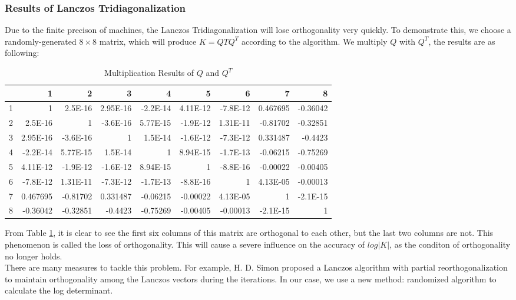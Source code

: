 \documentclass{article}
\begin{document}
\subsubsection{Results of Lanczos Tridiagonalization}
Due to the finite precison of machines, the Lanczos Tridiagonalization will lose orthogonality very quickly. To demonstrate this, we choose a randomly-generated $8\times 8$ matrix, which will produce $K=QTQ^T$ according to the algorithm. We multiply $Q$ with $Q^T$, the results are as following: 
\begin{table}[htbp]
	\centering
	\caption{Multiplication Results of $Q$ and $Q^T$}
	\begin{tabular}{rrrrrrrrr}
		\toprule
	    & 1     & 2     & 3     & 4     & 5     & 6     & 7     & 8 \\
		\midrule
		1     & 1     & 2.5E-16 & 2.95E-16 & -2.2E-14 & 4.11E-12 & -7.8E-12 & 0.467695 & -0.36042 \\
		2     & 2.5E-16 & 1     & -3.6E-16 & 5.77E-15 & -1.9E-12 & 1.31E-11 & -0.81702 & -0.32851 \\
		3     & 2.95E-16 & -3.6E-16 & 1     & 1.5E-14 & -1.6E-12 & -7.3E-12 & 0.331487 & -0.4423 \\
		4     & -2.2E-14 & 5.77E-15 & 1.5E-14 & 1     & 8.94E-15 & -1.7E-13 & -0.06215 & -0.75269 \\
		5     & 4.11E-12 & -1.9E-12 & -1.6E-12 & 8.94E-15 & 1     & -8.8E-16 & -0.00022 & -0.00405 \\
		6     & -7.8E-12 & 1.31E-11 & -7.3E-12 & -1.7E-13 & -8.8E-16 & 1     & 4.13E-05 & -0.00013 \\
		7     & 0.467695 & -0.81702 & 0.331487 & -0.06215 & -0.00022 & 4.13E-05 & 1     & -2.1E-15 \\
		8     & -0.36042 & -0.32851 & -0.4423 & -0.75269 & -0.00405 & -0.00013 & -2.1E-15 & 1 \\
		\bottomrule
	\end{tabular}%
	\label{tab1}%
\end{table}%
From Table \ref{tab1}, it is clear to see the first six columns of this matrix are orthogonal to each other, but the last two columns are not. This phenomenon is called the loss of orthogonality. This will cause a severe influence on the accuracy of $log|K|$, as the conditon of orthogonality no longer holds.\\
There are many measures to tackle this problem. For example, H. D. Simon proposed a Lanczos algorithm with partial reorthogonalization \cite{15} to maintain orthogonality among the Lanczos vectors during the iterations. In our case, we use a new method: randomized algorithm to calculate the log determinant. 
\end{document}

